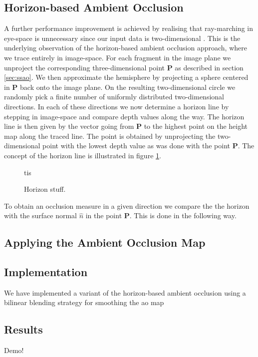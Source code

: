 \subsection{Horizon-based Ambient Occlusion}
A further performance improvement is achieved by realising that
ray-marching in eye-space is unnecessary since our input data is
two-dimensional \citep{hbao}. This is the underlying observation of
the horizon-based ambient occlusion approach, where we trace entirely
in image-space. For each fragment in the image plane we unproject the
corresponding three-dimensional point $\mathbf{P}$ as described in
section \ref{sec:ssao}. We then approximate the hemisphere by
projecting a sphere centered in $\mathbf{P}$ back onto the image
plane. On the resulting two-dimensional circle we randomly pick a
finite number of uniformly distributed two-dimensional directions. In
each of these directions we now determine a horizon line by stepping
in image-space and compare depth values along the way. The horizon
line is then given by the vector going from $\mathbf{P}$ to the
highest point on the height map along the traced line. The point is
obtained by unprojecting the two-dimensional point with the lowest
depth value as was done with the point $\mathbf{P}$. The concept of
the horizon line is illustrated in figure \ref{fig:horizon}.
\begin{figure}[h]
  \centering
  tis
  \caption{Horizon stuff.}
  \label{fig:horizon}
\end{figure}
To obtain an occlusion measure in a given direction we compare the
the horizon with the surface normal $\hat{n}$ in the point
$\mathbf{P}$. This is done in the following way.

\subsection{Applying the Ambient Occlusion Map}

\subsection{Implementation}

We have implemented a variant of the horizon-based ambient occlusion
using a bilinear blending strategy for smoothing the ao map

\subsection{Results}
Demo!

